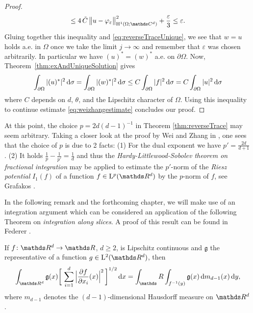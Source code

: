 \begin{proof}
\begin{align*}
    \leq 4 \, \tilde C \, \big\| u - \varphi_\varepsilon \big\|_{\HH^1(\Omega; \C^d)}^2 + \frac{\varepsilon}{3} 
    \leq \varepsilon.
  \end{align*}
  Gluing together this inequality and \eqref{eq:reverseTraceUnique}, we see that $w = u$ holds a.e. in $\Omega$ once we take the limit $j \to \infty$ and remember that $\varepsilon$ was chosen arbitrarily.
  In particular we have $(u)^* = (w)^*$ a.e. on $\partial\Omega$.
  Now, Theorem~\ref{thm:exAndUniqueSolution} gives
  \begin{align*}
    \int_{\partial\Omega} |(u)^*|^2 \, {\operatorname{d}\!{\sigma}} 
    = \int_{\partial\Omega} |(w)^*|^2 \, {\operatorname{d}\!{\sigma}}
    \leq C \int_{\partial\Omega} |f|^2 \, {\operatorname{d}\!{\sigma}} 
    = C \int_{\partial\Omega} |u|^2 \, {\operatorname{d}\!{\sigma}}
  \end{align*}
  where $C$ depends on $d$, $\theta$, and the Lipschitz character of $\Omega$.
  Using this inequality to continue estimate \ref{eq:weizhangestimate} concludes our proof.
\end{proof}

\begin{rem}
  At this point, the choice $p = {2d}({d - 1})^{-1}$ in Theorem \ref{thm:reverseTrace} may seem arbitrary.
  Taking a closer look at the proof by Wei and Zhang in \cite[Lem. 3.3]{weiZhang}, one sees that the choice of $p$ is due to 2 facts: (1) For the dual exponent we have $p' = \frac{2d}{d + 1}$. (2) It holds $\frac{1}{p} - \frac{1}{p'} = \frac{1}{d}$ and thus the \emph{Hardy-Littlewood-Sobolev theorem on fractional integration} may be applied to estimate the $p'$-norm of the \emph{Riesz potential} $I_1(f)$ of a function $f \in \Ell^p(\R^d)$ by the $p$-norm of $f$, see Grafakos \cite[Thm 6.1.3]{grafakos2009modern}.
\end{rem}

In the following remark and the forthcoming chapter, we will make use of an integration argument which can be considered an application of the following Theorem on \emph{integration along slices}. A proof of this result can be found in Federer \cite[Thm. 3.2.12]{federer}.

\begin{thm}
  \label{thm:coarea}
  If $f \colon \R^d \to \R$, $d \geq 2$, is Lipschitz continuous and $\mathfrak{g}$ the representative of a function $g \in \Ell^2(\R^d)$, then
  \begin{align}
    \label{eq:coarea}
    \int_{\R^d} \mathfrak{g}(x) \bigg[ \, \sum_{i = 1}^d \Big|\frac{\partial f}{\partial x_i}(x)\Big|^2 \, \bigg]^{1/2} \d x 
    = \int_\R \int_{f^{-1}(y)} \mathfrak{g}(x) \d m_{d - 1}(x) \d y,
  \end{align}
  where $m_{d - 1}$ denotes the $(d - 1)$-dimensional Hausdorff measure on $\R^d$.
\end{thm}

